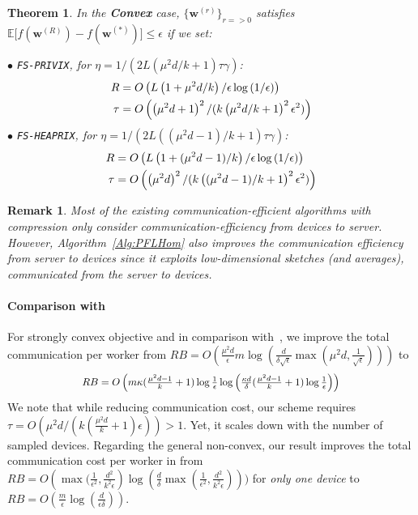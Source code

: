\documentclass[twoside]{article}
\newtheorem{theorem}{Theorem}
\newtheorem{remark}{Remark}
\newcommand*{\Resize}[2]{\resizebox{#1}{!}{$#2$}}%
\begin{document}
\begin{theorem}
In the \textbf{Convex} case, $\{ {\boldsymbol{w}}^{(r)}\}_{r=>0}$ satisfies $ \mathbb{E}\Big[f({\boldsymbol{w}}^{(R)})-f({\boldsymbol{w}}^{(*)})\Big]\leq \epsilon$ if we set:  

\noindent $\bullet$ \texttt{FS-PRIVIX}, for $\eta=1/(2L(\mu^2d/k+1)\tau\gamma)$:    
\begin{equation}\notag
\begin{split}
R& =O\left(L\left(1+\mu^2d/k\right)/\epsilon\log\left(1/\epsilon \right)\right)\\
\tau&=O\left(\left(\mu^2d+1\right)^2/(k\left(\mu^2d/k+1\right)^2\epsilon^2)\right)
 \end{split}
\end{equation}
\noindent $\bullet$ \texttt{FS-HEAPRIX}, for $\eta=1/(2L((\mu^2d-1)/k+1)\tau\gamma)$:   
\begin{equation}\notag
\begin{split}
R& =O\left(L\left(1+(\mu^2d-1)/k\right)/\epsilon\log\left(1/\epsilon \right)\right)\\
 \tau&=O\left(\left(\mu^2d\right)^2/(k\left((\mu^2d-1)/k+1\right)^2\epsilon^2)\right)
 \end{split}
\end{equation}
\end{theorem}


\begin{remark}
Most of the existing communication-efficient algorithms with compression only consider communication-efficiency from devices to server. 
However, Algorithm~\ref{Alg:PFLHom} also improves the communication efficiency from server to devices since it exploits low-dimensional sketches (and averages), communicated from the server to devices. 
\end{remark}

\paragraph{Comparison with \cite{ivkin2019communication}}
For strongly convex objective and in comparison with~\cite{ivkin2019communication}, we improve the total communication per worker from 
$RB=O\left(\frac{\mu^2 d}{\epsilon}m\log\left(\frac{d}{\delta\sqrt{\epsilon}}\max\left({\mu^2 d},\frac{1}{\sqrt{\epsilon}}\right)\right)\right)$ to 
\[ \Resize{8cm}{RB=O\left({m}\kappa(\frac{\mu^2d-1}{k}+1)\log\frac{1}{\epsilon}\log\left(\frac{\kappa d}{\delta}(\frac{\mu^2d-1}{k}+1)\log\frac{1}{\epsilon}\right)\right)}\]
We note that while reducing communication cost, our scheme requires $\tau=O(\mu^2 d/(k(\frac{\mu^2 d}{k}+1)\epsilon))>1$. 
Yet, it scales down with the number of sampled devices. 
Regarding the general non-convex, our result improves the total communication cost per worker in \cite{ivkin2019communication} from $RB=O\left(\max(\frac{1}{\epsilon^2},\frac{d^2}{k^2\epsilon}\right)\log(\frac{d}{\delta}\max(\frac{1}{\epsilon^2},\frac{d^2}{k^2\epsilon})))$ for \emph{only one device} to $RB=O(\frac{m}{\epsilon}\log(\frac{d}{\epsilon\delta}))$.
\end{document}
